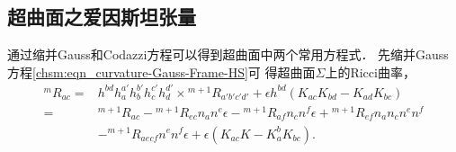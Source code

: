 \subsection{超曲面之爱因斯坦张量}
通过缩并Gauss和Codazzi方程可以得到超曲面中两个常用方程式．
先缩并Gauss方程\eqref{chsm:eqn_curvature-Gauss-Frame-HS}可
得超曲面$\Sigma$上的Ricci曲率，
\setlength{\mathindent}{0em}
\begin{equation}\label{chsm:eqn_contractRicci}
\begin{aligned}
    {}^{m}{R}_{ac}=&   %
      h^{bd} h_a^{a'}h_b^{b'}h_c^{c'}h_d^{d'}
    \times {}^{m+1}{R}_{a' b' c' d' } +\epsilon h^{bd} (K_{ac}K_{bd} - K_{ad} K_{bc} ) \\
    =&{}^{m+1} {R}_{ac}
    -{}^{m+1}{R}_{ec} {n}_{a} {n}^{e} \epsilon
    -{}^{m+1}{R}_{af} {n}_{c} {n}^{f} \epsilon
    +{}^{m+1}{R}_{ef} {n}_{a} {n}_{c} {n}^{e} {n}^{f}  \\
    &- {}^{m+1}{R}_{aecf} {n}^{e} {n}^{f} \epsilon
    +\epsilon (K_{ac}K - K_{a}^b K_{bc} ) .
\end{aligned}
\end{equation}\setlength{\mathindent}{2em}
